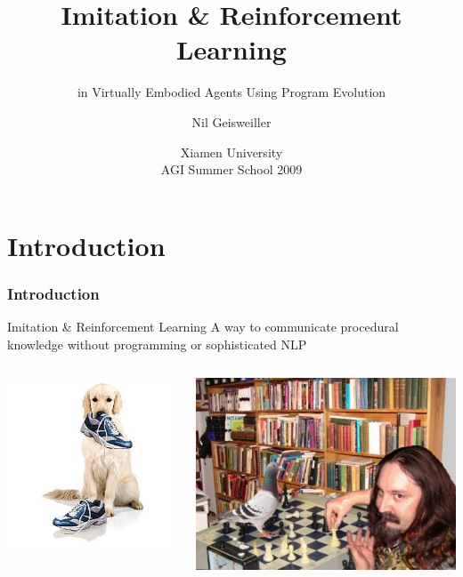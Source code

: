 \documentclass{beamer}
\title{Imitation \& Reinforcement Learning}
\subtitle{in Virtually Embodied Agents Using Program Evolution}
\author{Nil Geisweiller}
\institute[Xiamen University] %
{
  Novamente LLC
}
\date[Xiamen University AGI Summer School 2009] %
{Xiamen University\\ AGI Summer School 2009}
\begin{document}
\frame
{
  \maketitle
}
\section[Outline]{}
\frame{\tableofcontents}

\section{Introduction}

\frame
{
  \frametitle{Introduction}

  \begin{beamerboxesrounded}{Imitation \& Reinforcement Learning}
    A way to communicate
      \alert{procedural knowledge without programming}
      or sophisticated \alert{NLP}
  \end{beamerboxesrounded}

  \begin{columns}

    \column{1in}

    \includegraphics[scale=0.3]{dog_shoes.jpg}
 
    \column{2in}

    \includegraphics[scale=0.3]{pigeon-chess.jpg}
    
  \end{columns}
}
\end{document}
